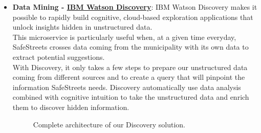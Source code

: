 \begin{itemize}
	\item \textbf{Data Mining - \href{https://cloud.ibm.com/catalog/services/discovery}{IBM Watson Discovery}}: IBM Watson Discovery makes it possible to rapidly build cognitive, cloud-based exploration applications that unlock insights hidden in unstructured data. 
	\\This microservice is particularly useful when, at a given time everyday, SafeStreets crosses data coming from the municipality with its own data to extract potential suggestions.
	\\With Discovery, it only takes a few steps to prepare our unstructured data coming from different sources and to create a query that will pinpoint the information SafeStreets needs. Discovery automatically use data analysis combined with cognitive intuition to take the unstructured data and enrich them to discover hidden information.
	\begin{figure}[h!]
		\caption{Complete architecture of our Discovery solution.}
	\end{figure}
	\FloatBarrier
	
\end{itemize}